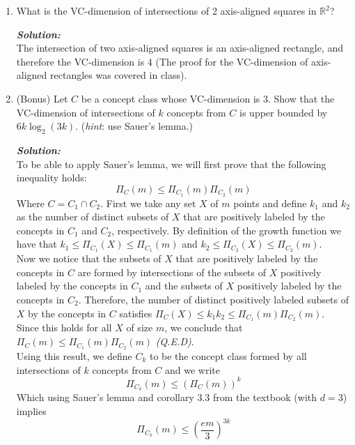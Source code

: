 \documentclass{article}
\newcommand{\hint}{\emph{hint}}
\begin{document}
\begin{enumerate}
\item What is the VC-dimension of intersections of 2 axis-aligned squares in $\mathbb{R}^2$?

\textbf{\emph{Solution:}}\\
The intersection of two axis-aligned squares is an axis-aligned rectangle, and therefore the VC-dimension is 4 (The proof for the VC-dimension of axis-aligned rectangles was covered in class).

\item (Bonus) Let $C$ be a concept class whose VC-dimension is $3$. Show that the VC-dimension of intersections of $k$ concepts from $C$ is upper bounded by $6k \log_2(3k)$.
(\hint: use Sauer's lemma.)

\textbf{\emph{Solution:}}\\
To be able to apply Sauer's lemma, we will first prove that the following inequality holds:
\begin{equation*}
    \Pi_C(m) \leq \Pi_{C_1}(m)\Pi_{C_2}(m)
\end{equation*}
Where $C = C_1 \cap C_2$. First we take any set $X$ of $m$ points and define $k_1$ and $k_2$ as the number of distinct subsets of $X$ that are positively labeled by the concepts in $C_1$ and $C_2$, respectively. By definition of the growth function we have that $k_1 \leq \Pi_{C_1}(X) \leq \Pi_{C_1}(m)$ and $k_2 \leq \Pi_{C_2}(X) \leq \Pi_{C_2}(m)$.\\
Now we notice that the subsets of $X$ that are positively labeled by the concepts in $C$ are formed by intersections of the subsets of $X$ positively labeled by the concepts in $C_1$ and the subsets of $X$ positively labeled by the concepts in $C_2$. Therefore, the number of distinct positively labeled subsets of $X$ by the concepts in $C$ satisfies $\Pi_C(X) \leq k_1 k_2 \leq \Pi_{C_1}(m) \Pi_{C_2}(m)$.\\
Since this holds for all $X$ of size $m$, we conclude that $\Pi_C(m) \leq \Pi_{C_1}(m)\Pi_{C_2}(m)$ \textit{(Q.E.D)}.\\
Using this result, we define $C_k$ to be the concept class formed by all intersections of $k$ concepts from $C$ and we write
\begin{equation*}
    \Pi_{C_k}(m) \leq \left(\Pi_C(m)\right)^k
\end{equation*}
Which using Sauer's lemma and corollary 3.3 from the textbook (with $d = 3$) implies
\begin{equation*}
    \Pi_{C_k}(m) \leq \left(\frac{em}{3}\right)^{3k}
\end{equation*}

\end{enumerate}
\end{document}
